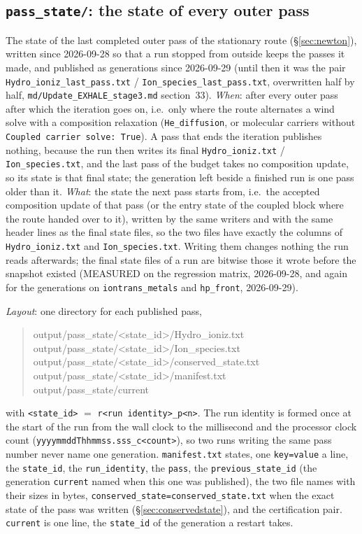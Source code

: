 \documentclass[english,a4paper]{my_memo}
\begin{document}
\subsection{\texttt{pass\_state/}: the state of every outer pass}
\label{sec:passstate}
The state of the last completed outer pass of the stationary route
(\S\ref{sec:newton}), written since 2026-09-28 so that a run stopped from
outside keeps the passes it made, and published as generations since
2026-09-29 (until then it was the pair
\texttt{Hydro\_ioniz\_last\_pass.txt} / \texttt{Ion\_species\_last\_pass.txt},
overwritten half by half, \texttt{md/Update\_EXHALE\_stage3.md} section~33).
\emph{When}: after every outer pass after which the iteration goes on, i.e.\
only where the route alternates a wind solve with a composition relaxation
(\texttt{He\_diffusion}, or molecular carriers without \texttt{Coupled carrier
solve: True}). A pass that ends the iteration publishes nothing, because the
run then writes its final \texttt{Hydro\_ioniz.txt} /
\texttt{Ion\_species.txt}, and the last pass of the budget takes no
composition update, so its state is that final state; the generation left
beside a finished run is one pass older than it. \emph{What}: the state the
next pass starts from, i.e.\ the accepted composition update of that pass (or
the entry state of the coupled block where the route handed over to it),
written by the same writers and with the same header lines as the final state
files, so the two files have exactly the columns of \texttt{Hydro\_ioniz.txt}
and \texttt{Ion\_species.txt}. Writing them changes nothing the run reads
afterwards; the final state files of a run are bitwise those it wrote before
the snapshot existed (MEASURED on the regression matrix, 2026-09-28, and again
for the generations on \texttt{iontrans\_metals} and \texttt{hp\_front},
2026-09-29).

\emph{Layout}: one directory for each published pass,
\begin{quote}\ttfamily\small
output/pass\_state/<state\_id>/Hydro\_ioniz.txt\\
output/pass\_state/<state\_id>/Ion\_species.txt\\
output/pass\_state/<state\_id>/conserved\_state.txt\\
output/pass\_state/<state\_id>/manifest.txt\\
output/pass\_state/current
\end{quote}
with \texttt{<state\_id>} $=$ \texttt{r<run identity>\_p<n>}. The run
identity is formed once at the start of the run from the wall clock to the
millisecond and the processor clock count
(\texttt{yyyymmddThhmmss.sss\_c<count>}), so two runs writing the same pass
number never name one generation. \texttt{manifest.txt} states, one
\texttt{key=value} a line, the \texttt{state\_id}, the \texttt{run\_identity},
the \texttt{pass}, the \texttt{previous\_state\_id} (the generation
\texttt{current} named when this one was published), the two file names with
their sizes in bytes, \texttt{conserved\_state=conserved\_state.txt} when
the exact state of the pass was written (\S\ref{sec:conservedstate}), and the
certification pair. \texttt{current} is one line,
the \texttt{state\_id} of the generation a restart takes.
\end{document}
